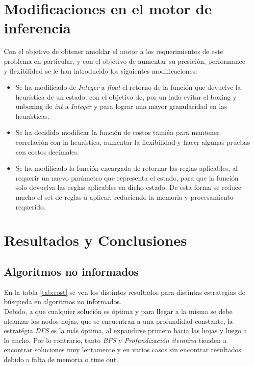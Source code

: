 \documentclass{sig-alternate}
\begin{document}
\section*{Modificaciones en el motor de inferencia}
Con el objetivo de obtener amoldar el motor a los requerimientos de este problema en particular, y con el objetivo de aumentar su presici\'on, performance y flexibilidad se  le han introducido los siguientes modificaciones:
\begin{itemize}
	\item Se ha modificado de \emph{Integer} a \emph{float} el retorno de la funci\'on que devuelve la heur\'istica de un estado, con el objetivo de, por un lado evitar el boxing y unboxing de \emph{int} a \emph{Integer} y para lograr una mayor granularidad en las heur\'isticas.
	\item Se ha decidido modificar la funci\'on de costos tami\'en para mantener correlaci\'on con la heur\'istica, aumentar la flexibilidad y hacer algunas pruebas con costos decimales.
	\item Se ha modificado la funci\'on encargada de retornar las reglas aplicables, al requerir un nuevo par\'ametro que representa el estado, para que la funci\'on solo devuelva las reglas aplicables en dicho estado. De esta forma se reduce mucho el set de reglas a aplicar, reduciendo la memoria y procesamiento requerido.
	\end{itemize}

\section*{Resultados y Conclusiones}
\subsection*{Algoritmos no informados}	
En la tabla \ref{tab:cost} se ven los distintos resultados para distintas estrategias de b\'usqueda	 en algoritmos no informados. \\
Debido, a que cualquier soluci\'on es \'optima y para llegar a la misma se debe alcanzar los nodos hojas, que se encuentran a una profundidad constante, la estrat\'egia  \emph{DFS} es la m\'as \'optima, al expandirse primero hacia las hojas y luego a lo ancho. Por lo contrario, tanto \emph{BFS} y \emph{Profundizaci\'on iterativa} tienden a encontrar soluciones muy lentamente y en varios casos sin encontrar resultados debido a falta de memoria o time out. \\
\end{document}
